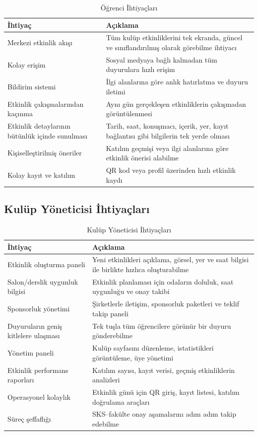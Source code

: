 \documentclass[a4paper,12pt]{report}
\begin{document}
\begin{table}[H]
\centering
\small
\begin{tabular}{|p{5cm}|p{9cm}|}
\hline
\textbf{İhtiyaç} & \textbf{Açıklama} \\
\hline
Merkezi etkinlik akışı & Tüm kulüp etkinliklerini tek ekranda, güncel ve sınıflandırılmış olarak görebilme ihtiyacı \\
\hline
Kolay erişim & Sosyal medyaya bağlı kalmadan tüm duyurulara hızlı erişim \\
\hline
Bildirim sistemi & İlgi alanlarına göre anlık hatırlatma ve duyuru iletimi \\
\hline
Etkinlik çakışmalarından kaçınma & Aynı gün gerçekleşen etkinliklerin çakışmadan görüntülenmesi \\
\hline
Etkinlik detaylarının bütünlük içinde sunulması & Tarih, saat, konuşmacı, içerik, yer, kayıt bağlantısı gibi bilgilerin tek yerde olması \\
\hline
Kişiselleştirilmiş öneriler & Katılım geçmişi veya ilgi alanlarına göre etkinlik önerisi alabilme \\
\hline
Kolay kayıt ve katılım & QR kod veya profil üzerinden hızlı etkinlik kaydı \\
\hline
\end{tabular}
\caption{Öğrenci İhtiyaçları}
\end{table}

\subsection{Kulüp Yöneticisi İhtiyaçları}

\begin{table}[H]
\centering
\small
\begin{tabular}{|p{5cm}|p{9cm}|}
\hline
\textbf{İhtiyaç} & \textbf{Açıklama} \\
\hline
Etkinlik oluşturma paneli & Yeni etkinlikleri açıklama, görsel, yer ve saat bilgisi ile birlikte hızlıca oluşturabilme \\
\hline
Salon/derslik uygunluk bilgisi & Etkinlik planlaması için odaların doluluk, saat uygunluğu ve onay takibi \\
\hline
Sponsorluk yönetimi & Şirketlerle iletişim, sponsorluk paketleri ve teklif takip paneli \\
\hline
Duyuruların geniş kitlelere ulaşması & Tek tuşla tüm öğrencilere görünür bir duyuru gönderebilme \\
\hline
Yönetim paneli & Kulüp sayfasını düzenleme, istatistikleri görüntüleme, üye yönetimi \\
\hline
Etkinlik performans raporları & Katılım sayısı, kayıt verisi, geçmiş etkinliklerin analizleri \\
\hline
Operasyonel kolaylık & Etkinlik günü için QR giriş, kayıt listesi, katılım doğrulama araçları \\
\hline
Süreç şeffaflığı & SKS–fakülte onay aşamalarını adım adım takip edebilme \\
\hline
\end{tabular}
\caption{Kulüp Yöneticisi İhtiyaçları}
\end{table}
\end{document}
